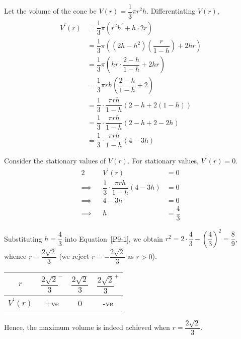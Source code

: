 \documentclass{jhwhw}
\begin{document}
            Let the volume of the cone be $V(r) = \dfrac13 \pi r^2 h$. Differentiating $V(r)$,
            \begin{align*}
                V^\prime(r) &= \dfrac13 \pi (r^2 h^\prime + h \cdot 2r)\\
                &= \dfrac13 \pi \left(\left(2h - h^2\right)\left(\dfrac{r}{1-h}\right) + 2hr\right)\\
                &= \dfrac13 \pi \left(hr\cdot\dfrac{2 - h}{1-h} + 2hr\right)\\
                &= \dfrac13 \pi rh \left(\dfrac{2 - h}{1-h} + 2\right)\\
                &= \dfrac13 \cdot \dfrac{\pi rh}{1-h}(2 - h + 2(1-h))\\
                &= \dfrac13 \cdot \dfrac{\pi rh}{1-h}(2 - h + 2-2h)\\
                &= \dfrac13 \cdot \dfrac{\pi rh}{1-h}(4-3h)
            \end{align*}

            Consider the stationary values of $V(r)$. For stationary values, $V^\prime(r) = 0$.
            \begin{alignat*}{2}
                &&V^\prime(r) &= 0\\
                \implies&& \dfrac13 \cdot \dfrac{\pi rh}{1-h}(4-3h) &= 0\\
                \implies&& 4-3h &= 0\\
                \implies&& h &= \dfrac43
            \end{alignat*}

            Substituting $h = \dfrac43$ into Equation~\ref{P9-1}, we obtain $r^2 = 2\cdot\dfrac43 - \left(\dfrac43\right)^2  = \dfrac89$, whence $r = \dfrac{2\sqrt2}3$ (we reject $r = -\dfrac{2\sqrt2}3$ as $r > 0$).

            \begin{table}[h]
                \centering
                \begin{tabular}{|c|c|c|c|}
                \hline
                $r$ & $\dfrac{2\sqrt2}3^-$ & $\dfrac{2\sqrt2}3$ & $\dfrac{2\sqrt2}3^+$ \\[1ex]\hline
                $V^\prime(r)$ & +ve   & 0 & -ve   \\\hline
                \end{tabular}
            \end{table}

            Hence, the maximum volume is indeed achieved when $r =\dfrac{2\sqrt2}3$. 
\end{document}
